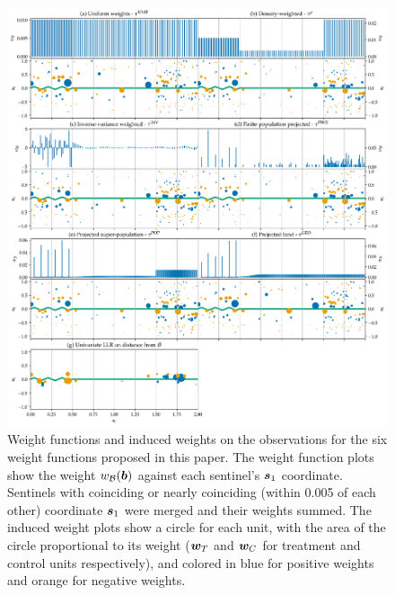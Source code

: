 \begin{figure}[ptb]
\centering
\includegraphics[width=\textwidth]{../figures/weight_functions.png}
\caption{
	\label{fig:weight_functions}
	Weight functions and induced weights on the observations for the six weight functions proposed in this paper. The weight function plots show the weight \(w_{\mathcal{B}}(\bm{b})\) against each sentinel's \(\bm{s}_1\) coordinate. Sentinels with coinciding or nearly coinciding (within 0.005 of each other) coordinate \(\bm{s}_1\) were merged and their weights summed. The induced weight plots show a circle for each unit, with the area of the circle proportional to its weight (\(\bm{w}_{T}\) and \(\bm{w}_{C}\) for treatment and control units respectively), and colored in blue for positive weights and orange for negative weights.}
\end{figure}

